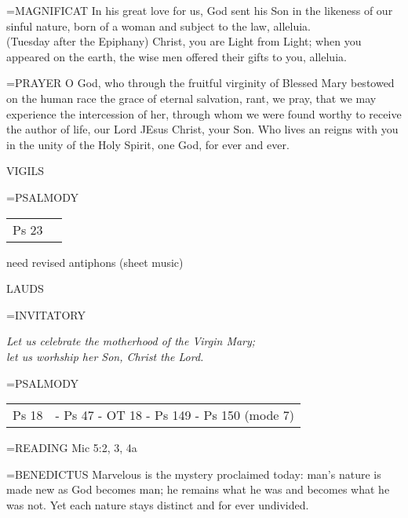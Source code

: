 \hangindent=\parindent \small{MAGNIFICAT 	In his great love for us, God sent his Son in the likeness of our sinful nature, born of a woman and subject to the law, alleluia.\\}
(Tuesday after the Epiphany)
Christ, you are Light from Light; when you appeared on the earth, the wise men offered their gifts to you, alleluia.

\hangindent=\parindent \small{PRAYER 	O God, who through the fruitful virginity of Blessed Mary bestowed on the human race the grace of eternal salvation, rant, we pray, that we may experience the intercession of her, through whom we were found worthy to receive the author of life, our Lord JEsus Christ, your Son. Who lives an reigns with you in the unity of the Holy Spirit, one God, for ever and ever.}

\begin{flushleft}\normalsize VIGILS\\\end{flushleft}
\hangindent=\parindent \small{PSALMODY}
\begin{center}
\begin{tabular}{ l l }
Ps 23 & \\
\end{tabular}
\end{center}		

need revised antiphons (sheet music)

\begin{flushleft}\normalsize LAUDS\\\end{flushleft}
\hangindent=\parindent \small{INVITATORY}
\begin{center}
\textit{Let us celebrate the motherhood of the Virgin Mary;\\}
\textit{let us worhship her Son, Christ the Lord.\\}
\end{center}

\hangindent=\parindent \small{PSALMODY}
\begin{center}
\begin{tabular}{ l l }
Ps 18 &  - Ps 47 - OT 18 - Ps 149 - Ps 150 (mode 7)\\
\end{tabular}
\end{center}		

\hangindent=\parindent \small{READING}    Mic 5:2, 3, 4a \textbf{   \\}

\hangindent=\parindent \small{BENEDICTUS 	Marvelous is the mystery proclaimed today: man's nature is made new as God becomes man; he remains what he was and becomes what he was not. Yet each nature stays distinct and for ever undivided.\\}

